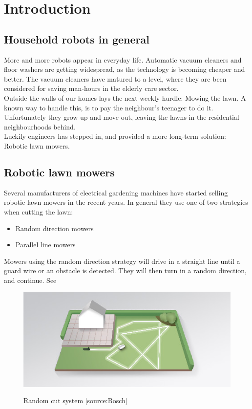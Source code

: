 \chapter{Introduction}
\section{Household robots in general}
More and more robots appear in everyday life. Automatic vacuum cleaners and floor washers are getting widespread, as the technology is becoming cheaper and better. The vacuum cleaners have matured to a level, where they are been considered for saving man-hours in the elderly care sector.\\

\noindent
Outside the walls of our homes lays the next weekly hurdle: Mowing the lawn. A known way to handle this, is to pay the neighbour's teenager to do it. Unfortunately they grow up and move out, leaving the lawns in the residential neighbourhoods behind.\\ 

\noindent
Luckily engineers has stepped in, and provided a more long-term solution: Robotic lawn mowers.

\section{Robotic lawn mowers}
Several manufacturers of electrical gardening machines have started selling robotic lawn mowers in the recent years. In general they use one of two strategies when cutting the lawn:
\begin{itemize}
	\item Random direction mowers
	\item Parallel line mowers
\end{itemize}

\noindent
Mowers using the random direction strategy will drive in a straight line until a guard wire or an obstacle is detected. They will then turn in a random direction, and continue. See 

\begin{figure}[H]
\centering
\includegraphics[scale=0.8]{figures/noLogicut.jpg} 
\label{fig:randomcut}
\caption{Random cut system [source:Bosch]} 
\end{figure}

